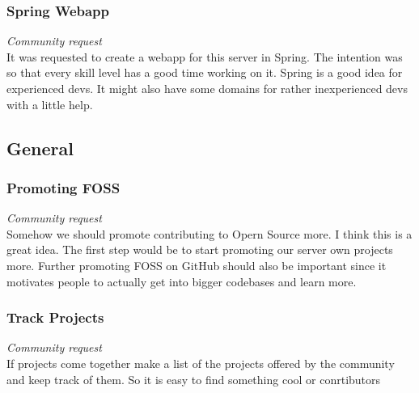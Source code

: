 \documentclass{article}
\begin{document}
    \subsubsection{Spring Webapp}
    \label{sec:springwebapp}
    \textit{Community request} \\ \newline 
    It was requested to create a webapp for this server in Spring. 
    The intention was so that every skill level has a good time working on it. 
    Spring is a good idea for experienced devs. It might also have some domains for rather inexperienced devs with a little help.

    \subsection{General}

    \subsubsection{Promoting FOSS}
    \textit{Community request} \\ \newline 
    Somehow we should promote contributing to Opern Source more. 
    I think this is a great idea. 
    The first step would be to start promoting our server own projects more.
    Further promoting FOSS on GitHub should also be important since it motivates people to actually get into bigger codebases and learn more.

    \subsubsection{Track Projects}
    \textit{Community request} \\ \newline 
    If projects come together make a list of the projects offered by the community and keep track of them.
    So it is easy to find something cool or conrtibutors
    
\end{document}
